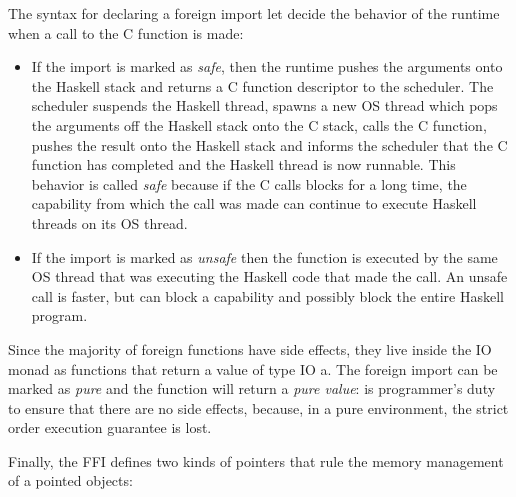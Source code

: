 The syntax for declaring a foreign import let decide the behavior of the runtime when a call to the C function is made:
\begin{itemize}
\item If the import is marked as \emph{safe}, then the runtime pushes the arguments onto the Haskell stack and returns a C function descriptor to the scheduler.
The scheduler suspends the Haskell thread, spawns a new OS thread which pops the arguments off the Haskell stack onto the C stack, calls the C function, pushes the result onto the Haskell stack and informs the scheduler that the C function has completed and the Haskell thread is now runnable.
This behavior is called \emph{safe} because if the C calls blocks for a long time, the capability from which the call was made can continue to execute Haskell threads on its OS thread.
\item If the import is marked as \emph{unsafe} then the function is executed by the same OS thread that was executing the Haskell code that made the call. An unsafe call is faster, but can block a capability and possibly block the entire Haskell program.
\end{itemize}

Since the majority of foreign functions have side effects, they live inside the IO monad as functions that return a value of type IO a. The foreign import can be marked as \emph{pure} and the function will return a \emph{pure value}: is programmer's duty to ensure that there are no side effects, because, in a pure environment, the strict order execution guarantee is lost.

Finally, the FFI defines two kinds of pointers that rule the memory management of a pointed objects:


